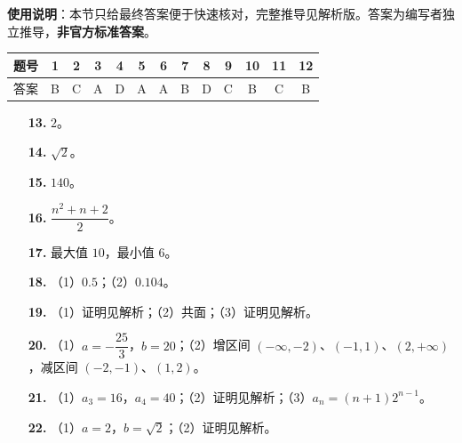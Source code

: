 
\begin{gknotice}
\textbf{使用说明}：本节只给最终答案便于快速核对，完整推导见解析版。答案为编写者独立推导，\textbf{非官方标准答案}。
\end{gknotice}

\begin{center}\begin{tabular}{ccccccccccccc}
\toprule
题号 & 1 & 2 & 3 & 4 & 5 & 6 & 7 & 8 & 9 & 10 & 11 & 12 \\
\midrule
答案 & B & C & A & D & A & A & B & D & C & B & C & B \\
\bottomrule
\end{tabular}\end{center}

\begin{itemize}[leftmargin=2.6em]
  \item[\textbf{13.}] $2$。
  \item[\textbf{14.}] $\sqrt2$。
  \item[\textbf{15.}] $140$。
  \item[\textbf{16.}] $\dfrac{n^2+n+2}2$。
\end{itemize}

\begin{itemize}[leftmargin=2.6em]
  \item[\textbf{17.}] 最大值 $10$，最小值 $6$。
  \item[\textbf{18.}] （1）$0.5$；（2）$0.104$。
  \item[\textbf{19.}] （1）证明见解析；（2）共面；（3）证明见解析。
  \item[\textbf{20.}] （1）$a=-\dfrac{25}3$，$b=20$；（2）增区间 $(-\infty,-2)$、$(-1,1)$、$(2,+\infty)$，减区间 $(-2,-1)$、$(1,2)$。
  \item[\textbf{21.}] （1）$a_3=16$，$a_4=40$；（2）证明见解析；（3）$a_n=(n+1)2^{n-1}$。
  \item[\textbf{22.}] （1）$a=2$，$b=\sqrt2$；（2）证明见解析。
\end{itemize}

